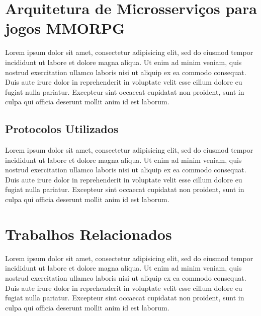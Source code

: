 \section{Arquitetura de Microsserviços para jogos MMORPG}

Lorem ipsum dolor sit amet, consectetur adipisicing elit, sed do eiusmod tempor incididunt ut labore et dolore magna aliqua. Ut enim ad minim veniam, quis nostrud exercitation ullamco laboris nisi ut aliquip ex ea commodo consequat. Duis aute irure dolor in reprehenderit in voluptate velit esse cillum dolore eu fugiat nulla pariatur. Excepteur sint occaecat cupidatat non proident, sunt in culpa qui officia deserunt mollit anim id est laborum.

\subsection{Protocolos Utilizados}

Lorem ipsum dolor sit amet, consectetur adipisicing elit, sed do eiusmod tempor incididunt ut labore et dolore magna aliqua. Ut enim ad minim veniam, quis nostrud exercitation ullamco laboris nisi ut aliquip ex ea commodo consequat. Duis aute irure dolor in reprehenderit in voluptate velit esse cillum dolore eu fugiat nulla pariatur. Excepteur sint occaecat cupidatat non proident, sunt in culpa qui officia deserunt mollit anim id est laborum.

\section{Trabalhos Relacionados}

Lorem ipsum dolor sit amet, consectetur adipisicing elit, sed do eiusmod tempor incididunt ut labore et dolore magna aliqua. Ut enim ad minim veniam, quis nostrud exercitation ullamco laboris nisi ut aliquip ex ea commodo consequat. Duis aute irure dolor in reprehenderit in voluptate velit esse cillum dolore eu fugiat nulla pariatur. Excepteur sint occaecat cupidatat non proident, sunt in culpa qui officia deserunt mollit anim id est laborum.

\label{sec:similares}
